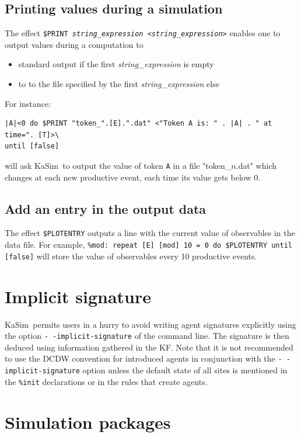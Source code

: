 \documentclass[11pt]{book}
\def\KaSim{\textsf{KaSim}}
\def\ttt#1{\texttt{#1}}
\begin{document}
\subsection{Printing values during a simulation}
The effect \ttt{\$PRINT \textit{string\_expression}
  <\textit{string\_expression}>} enables one to output values during a
computation to
\begin{itemize}
\item standard output if the first \textit{string\_expression} is empty
\item to to the file specified by the first \textit{string\_expression} else
\end{itemize}
For instance:
\begin{lstlisting}[language=kappa]
%mod: repeat \
|A|<0 do $PRINT "token_".[E].".dat" <"Token A is: " . |A| . " at time=". [T]>\
until [false]
\end{lstlisting}
will ask \KaSim~to output the value of token \ttt{A} in a file
"token\_$n$.dat" which changes at each new productive event, each time
its value gets below 0.

\subsection{Add an entry in the output data}
The effect \ttt{\$PLOTENTRY} outputs a line with the current value of observables in the data file. For example,
\lstinline[language=kappa]!%mod: repeat [E] [mod] 10 = 0 do $PLOTENTRY until [false]!
will store the value of observables every 10 productive events.

\section{Implicit signature}
\KaSim~permits users in a hurry to avoid writing agent signatures explicitly using the option \ttt{-\,-implicit-signature} of the command line. The signature is then deduced using information gathered in the KF. Note that it is not recommended to use the DCDW convention for introduced agents in conjunction with the \ttt{-\,-implicit-signature} option unless the default state of all sites is mentioned in the \ttt{\%init} declarations or in the rules that create agents.

\section{Simulation packages}
\end{document}

